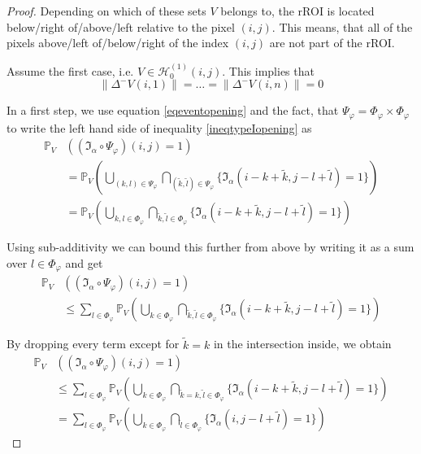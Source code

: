 \documentclass[a4paper,12pt]{article}
\newcommand{\norm}[1]{\lVert#1\rVert}
\theoremstyle{plain}
\theoremstyle{definition}
\begin{document}
\begin{proof}
	Depending on which of these sets $V$ belongs to, the rROI is located below/right of/above/left relative to the pixel $(i, j)$. This means, that all of the pixels above/left of/below/right of the index $(i, j)$ are not part of the rROI.
	
	Assume the first case, i.e. $V \in \mathcal{H}_0^{(1)}(i, j)$. This implies that
	\begin{equation*}
		\norm{\Delta^- V(i, 1)} = \ldots = \norm{\Delta^- V(i, n)} = 0
	\end{equation*}
	
	In a first step, we use equation \eqref{eqeventopening} and the fact, that $\Psi_\varphi = \Phi_\varphi \times \Phi_\varphi$ to write the left hand side of inequality \eqref{ineqtypeIopening} as
	\begin{align*}
		\mathbb{P}_V&( (\mathfrak{I}_\alpha \circ \Psi_\varphi)(i, j) = 1 ) \\
		&= \mathbb{P}_V\left( \bigcup_{(k, l) \in \Psi_\varphi} \bigcap_{(\tilde{k}, \tilde{l}) \in \Psi_\varphi} \{ \mathfrak{I}_\alpha(i - k + \tilde{k}, j - l + \tilde{l}) = 1 \} \right) \\
		&= \mathbb{P}_V\left( \bigcup_{k, l \in \Phi_\varphi} \bigcap_{\tilde{k}, \tilde{l} \in \Phi_\varphi} \{ \mathfrak{I}_\alpha(i - k + \tilde{k}, j - l + \tilde{l}) = 1 \} \right)
	\end{align*}
	
	Using sub-additivity we can bound this further from above by writing it as a sum over $l \in \Phi_\varphi$ and get
	\begin{align*}
		\mathbb{P}_V&( (\mathfrak{I}_\alpha \circ \Psi_\varphi)(i, j) = 1 ) \\
		&\leq \sum_{l \in \Phi_\varphi} \mathbb{P}_V\left( \bigcup_{k \in \Phi_\varphi} \bigcap_{\tilde{k}, \tilde{l} \in \Phi_\varphi} \{ \mathfrak{I}_\alpha(i - k + \tilde{k}, j - l + \tilde{l}) = 1 \} \right)
	\end{align*}
	
	By dropping every term except for $\tilde{k} = k$ in the intersection inside, we obtain
	\begin{align*}
		\mathbb{P}_V&( (\mathfrak{I}_\alpha \circ \Psi_\varphi)(i, j) = 1 ) \\
		&\leq \sum_{l \in \Phi_\varphi} \mathbb{P}_V\left( \bigcup_{k \in \Phi_\varphi} \bigcap_{\tilde{k} = k, \tilde{l} \in \Phi_\varphi} \{ \mathfrak{I}_\alpha(i - k + \tilde{k}, j - l + \tilde{l}) = 1 \} \right) \\
		&= \sum_{l \in \Phi_\varphi} \mathbb{P}_V\left( \bigcup_{k \in \Phi_\varphi} \bigcap_{\tilde{l} \in \Phi_\varphi} \{ \mathfrak{I}_\alpha(i, j - l + \tilde{l}) = 1 \} \right)
	\end{align*}
	

\end{proof}
\end{document}
